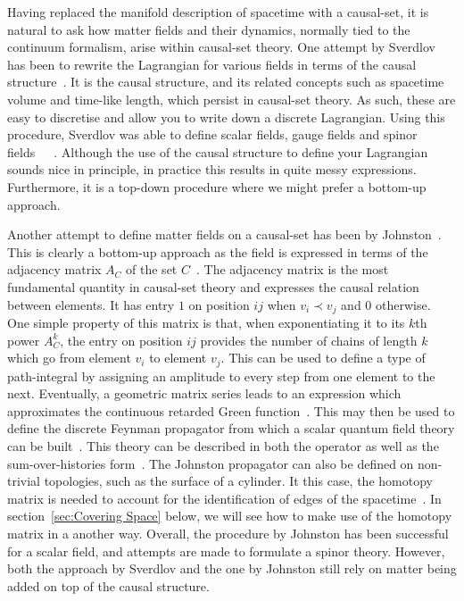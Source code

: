 \documentclass[a4paper,12pt]{article}
\numberwithin{equation}{section}
\begin{document}
Having replaced the manifold description of spacetime with a causal-set, it is natural to ask how matter fields and their dynamics, normally tied to the continuum formalism, arise within causal-set theory. One attempt by Sverdlov has been to rewrite the Lagrangian for various fields in terms of the causal structure~\cite{Sverdlov2009}. It is the causal structure, and its related concepts such as spacetime volume and time-like length, which persist in causal-set theory. As such, these are easy to discretise and allow you to write down a discrete Lagrangian. Using this procedure, Sverdlov was able to define scalar fields, gauge fields and spinor fields~\cite{Sverdlov2008}~\cite{Sverdlov2008b}~\cite{Sverdlov2008a}. Although the use of the causal structure to define your Lagrangian sounds nice in principle, in practice this results in quite messy expressions. Furthermore, it is a top-down procedure where we might prefer a bottom-up approach.

Another attempt to define matter fields on a causal-set has been by Johnston~\cite{Johnston2010}. This is clearly a bottom-up approach as the field is expressed in terms of the adjacency matrix $A_{C}$ of the set $C$~\cite{Johnston2008}. The adjacency matrix is the most fundamental quantity in causal-set theory and expresses the causal relation between elements. It has entry $1$ on position $ij$ when $v_i \prec v_j$ and $0$ otherwise. One simple property of this matrix is that, when exponentiating it to its $k$th power $A_{C}^{k}$, the entry on position $ij$ provides the number of chains of length $k$ which go from element $v_i$ to element $v_j$. This can be used to define a type of path-integral by assigning an amplitude to every step from one element to the next. Eventually, a geometric matrix series leads to an expression which approximates the continuous retarded Green function~\cite{Johnston2009}. This may then be used to define the discrete Feynman propagator from which a scalar quantum field theory can be built~\cite{Johnston2009a}. This theory can be described in both the operator as well as the sum-over-histories form~\cite{Sorkin2011}. The Johnston propagator can also be defined on non-trivial topologies, such as the surface of a cylinder. It this case, the homotopy matrix is needed to account for the identification of edges of the spacetime~\cite{Schmitzer2010}. In section~\ref{sec:Covering Space} below, we will see how to make use of the homotopy matrix in a another way. Overall, the procedure by Johnston has been successful for a scalar field, and attempts are made to formulate a spinor theory. However, both the approach by Sverdlov and the one by Johnston still rely on matter being added on top of the causal structure.
\end{document}
